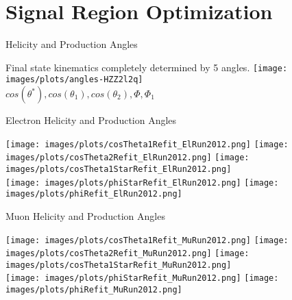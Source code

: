 \section{Signal Region Optimization}


\begin{frame}{Helicity and Production Angles}
\begin{center}
Final state kinematics completely determined by 5 angles.
\texttt{[image: images/plots/angles-HZZ2l2q]}
\\
$ cos(\theta^*), cos(\theta_1), cos(\theta_2), \Phi, \Phi_1$
\end{center}
\end{frame}


\begin{frame}{Electron Helicity and Production Angles}
\begin{center}
\texttt{[image: images/plots/cosTheta1Refit\_ElRun2012.png]}
\texttt{[image: images/plots/cosTheta2Refit\_ElRun2012.png]}
\texttt{[image: images/plots/cosTheta1StarRefit\_ElRun2012.png]}
\\
\texttt{[image: images/plots/phiStarRefit\_ElRun2012.png]}
\texttt{[image: images/plots/phiRefit\_ElRun2012.png]}
\end{center}
\end{frame}


\begin{frame}{Muon Helicity and Production Angles}
\begin{center}
\texttt{[image: images/plots/cosTheta1Refit\_MuRun2012.png]}
\texttt{[image: images/plots/cosTheta2Refit\_MuRun2012.png]}
\texttt{[image: images/plots/cosTheta1StarRefit\_MuRun2012.png]}
\\
\texttt{[image: images/plots/phiStarRefit\_MuRun2012.png]}
\texttt{[image: images/plots/phiRefit\_MuRun2012.png]}

\end{center}
\end{frame}



